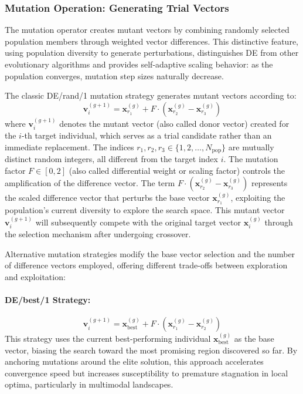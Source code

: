 \documentclass[12pt,a4paper]{report}
\begin{document}
\subsubsection{Mutation Operation: Generating Trial Vectors}

The mutation operator creates mutant vectors by combining randomly selected population members through weighted vector differences. This distinctive feature, using population diversity to generate perturbations, distinguishes DE from other evolutionary algorithms and provides self-adaptive scaling behavior: as the population converges, mutation step sizes naturally decrease.

The classic DE/rand/1 mutation strategy generates mutant vectors according to:
\begin{equation}
\mathbf{v}_i^{(g+1)} = \mathbf{x}_{r_1}^{(g)} + F \cdot \left( \mathbf{x}_{r_2}^{(g)} - \mathbf{x}_{r_3}^{(g)} \right)
\label{eq:de_rand_1}
\end{equation}
where $\mathbf{v}_i^{(g+1)}$ denotes the mutant vector (also called donor vector) created for the $i$-th target individual, which serves as a trial candidate rather than an immediate replacement. The indices $r_1, r_2, r_3 \in \{1, 2, \ldots, N_{\text{pop}}\}$ are mutually distinct random integers, all different from the target index $i$. The mutation factor $F \in [0, 2]$ (also called differential weight or scaling factor) controls the amplification of the difference vector. The term $F \cdot (\mathbf{x}_{r_2}^{(g)} - \mathbf{x}_{r_3}^{(g)})$ represents the scaled difference vector that perturbs the base vector $\mathbf{x}_{r_1}^{(g)}$, exploiting the population's current diversity to explore the search space. This mutant vector $\mathbf{v}_i^{(g+1)}$ will subsequently compete with the original target vector $\mathbf{x}_i^{(g)}$ through the selection mechanism after undergoing crossover.

Alternative mutation strategies modify the base vector selection and the number of difference vectors employed, offering different trade-offs between exploration and exploitation:

\paragraph{DE/best/1 Strategy:}
\begin{equation}
\mathbf{v}_i^{(g+1)} = \mathbf{x}_{\text{best}}^{(g)} + F \cdot \left( \mathbf{x}_{r_1}^{(g)} - \mathbf{x}_{r_2}^{(g)} \right)
\end{equation}
This strategy uses the current best-performing individual $\mathbf{x}_{\text{best}}^{(g)}$ as the base vector, biasing the search toward the most promising region discovered so far. By anchoring mutations around the elite solution, this approach accelerates convergence speed but increases susceptibility to premature stagnation in local optima, particularly in multimodal landscapes.
\end{document}
